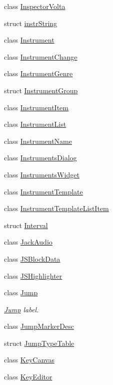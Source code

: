 \begin{DoxyCompactItemize}
class \hyperlink{class_ms_1_1_inspector_volta}{Inspector\+Volta}
\item 
struct \hyperlink{struct_ms_1_1instr_string}{instr\+String}
\item 
class \hyperlink{class_ms_1_1_instrument}{Instrument}
\item 
class \hyperlink{class_ms_1_1_instrument_change}{Instrument\+Change}
\item 
class \hyperlink{class_ms_1_1_instrument_genre}{Instrument\+Genre}
\item 
struct \hyperlink{struct_ms_1_1_instrument_group}{Instrument\+Group}
\item 
class \hyperlink{class_ms_1_1_instrument_item}{Instrument\+Item}
\item 
class \hyperlink{class_ms_1_1_instrument_list}{Instrument\+List}
\item 
class \hyperlink{class_ms_1_1_instrument_name}{Instrument\+Name}
\item 
class \hyperlink{class_ms_1_1_instruments_dialog}{Instruments\+Dialog}
\item 
class \hyperlink{class_ms_1_1_instruments_widget}{Instruments\+Widget}
\item 
class \hyperlink{class_ms_1_1_instrument_template}{Instrument\+Template}
\item 
class \hyperlink{class_ms_1_1_instrument_template_list_item}{Instrument\+Template\+List\+Item}
\item 
struct \hyperlink{struct_ms_1_1_interval}{Interval}
\item 
class \hyperlink{class_ms_1_1_jack_audio}{Jack\+Audio}
\item 
class \hyperlink{class_ms_1_1_j_s_block_data}{J\+S\+Block\+Data}
\item 
class \hyperlink{class_ms_1_1_j_s_highlighter}{J\+S\+Highlighter}
\item 
class \hyperlink{class_ms_1_1_jump}{Jump}
\begin{DoxyCompactList}\small\item\em \hyperlink{class_ms_1_1_jump}{Jump} label. \end{DoxyCompactList}\item 
class \hyperlink{class_ms_1_1_jump_marker_desc}{Jump\+Marker\+Desc}
\item 
struct \hyperlink{struct_ms_1_1_jump_type_table}{Jump\+Type\+Table}
\item 
class \hyperlink{class_ms_1_1_key_canvas}{Key\+Canvas}
\item 
class \hyperlink{class_ms_1_1_key_editor}{Key\+Editor}

\end{DoxyCompactItemize}
